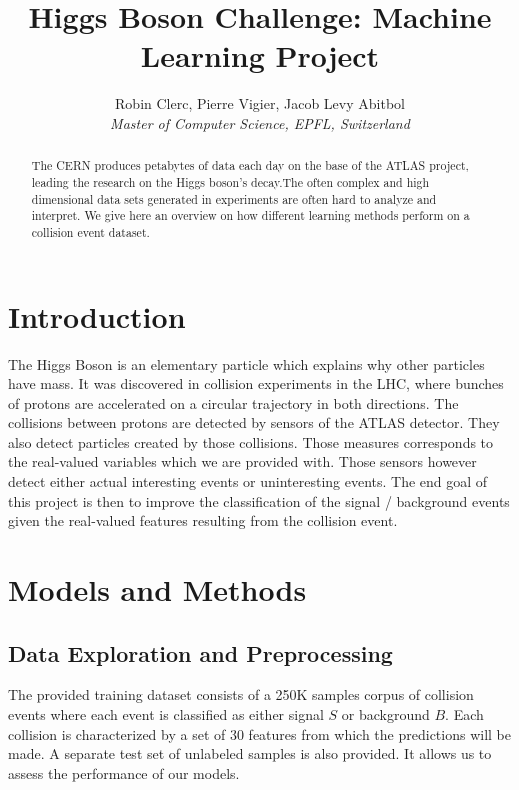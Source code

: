 \documentclass[10pt,conference,compsocconf]{IEEEtran}
\begin{document}
\title{Higgs Boson Challenge: Machine Learning Project}

\author{
  Robin Clerc, Pierre Vigier, Jacob Levy Abitbol\\
  \textit{Master of Computer Science, EPFL, Switzerland}
}

\maketitle

\begin{abstract}
  The CERN produces petabytes of data each day on the base of the ATLAS project, leading the research on the Higgs boson's decay.The often complex and high dimensional data sets generated in experiments are often hard to analyze and interpret. We give here an overview on how different learning methods perform on a collision event dataset.
  \end{abstract}

\section{Introduction}

The Higgs Boson is an elementary particle which explains why other particles have mass. It was discovered in collision experiments in the LHC, where bunches of protons are accelerated on a circular trajectory in both directions. The collisions between protons are detected by sensors of the ATLAS detector. They also detect particles created by those collisions. Those measures corresponds to the real-valued variables which we are provided with. Those sensors however detect either actual interesting events or uninteresting events. The end goal of this project is then to improve the classification of the signal / background events given the real-valued features resulting from the collision event.

\section{Models and Methods}
\label{sec:structure-paper}

\subsection{Data Exploration and Preprocessing}

The provided training dataset consists of a 250K samples corpus of collision events where each event is classified as either signal $S$ or background $B$. Each collision is characterized by a set of 30 features from which the predictions will be made. A separate test set of unlabeled samples is also provided. It allows us to assess the performance of our models.
\end{document}
